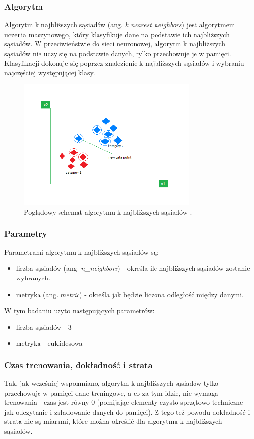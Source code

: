 \subsubsection{Algorytm}\label{subsubsec:algorytm}
Algorytm k najbliższych sąsiadów (ang. \textit{k nearest neighbors}) jest algorytmem uczenia maszynowego, który klasyfikuje dane na podstawie ich najbliższych sąsiadów.
W przeciwieństwie do sieci neuronowej, algorytm k najbliższych sąsiadów nie uczy się na podstawie danych, tylko przechowuje je w pamięci.
Klasyfikacji dokonuje się poprzez znalezienie k najbliższych sąsiadów i wybraniu najczęściej występującej klasy.
\begin{figure}[H]
    \centering
    \includegraphics[width=0.8\textwidth]{img/knn.png}
    \caption{Poglądowy schemat algorytmu k najbliższych sąsiadów \cite{knn-GeeksforGeeks_2023}.}
    \label{fig:knn}
\end{figure}
\subsubsection{Parametry}\label{subsubsec:parametry}
Parametrami algorytmu k najbliższych sąsiadów są:
\begin{itemize}
    \item liczba sąsiadów (ang. \textit{n\_neighbors}) - określa ile najbliższych sąsiadów zostanie wybranych.
    \item metryka (ang. \textit{metric}) - określa jak będzie liczona odległość między danymi.
\end{itemize}
W tym badaniu użyto następujących parametrów:
\begin{itemize}
    \item liczba sąsiadów - 3
    \item metryka - euklidesowa
\end{itemize}
\subsubsection{Czas trenowania, dokładność i strata}\label{subsubsec:czas_trenowania_knn}
Tak, jak wcześniej wspomniano, algorytm k najbliższych sąsiadów tylko przechowuje w pamięci dane treningowe, a co za tym idzie, nie wymaga trenowania - czas jest równy 0 
(pomijając elementy czysto sprzętowo-techniczne jak odczytanie i załadowanie danych do pamięci).
Z tego też powodu dokładność i strata nie są miarami, które można określić dla algorytmu k najbliższych sąsiadów.

